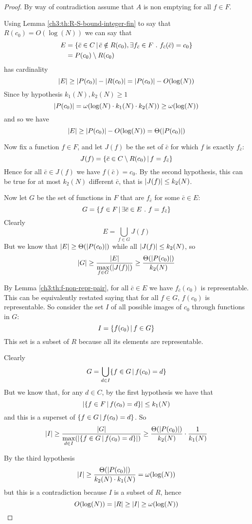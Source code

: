 \begin{proof}
	By way of contradiction assume that $A$ is non emptying for all $f \in F$.

	Using Lemma \ref{ch3:th:R-S-bound-integer-fin} to say that $R(c_0) = O(\log(N))$ we can say that
	\begin{align*}
		E &= \{ \bar{c} \in C \,\vert\, \bar{c} \notin R(c_0), \exists f_{\bar{c}} \in F\ .\ f_{\bar{c}}(\bar{c}) = c_0 \} \\
		&= P(c_0) \setminus R(c_0)
	\end{align*}
	has cardinality
	\[
	\lvert E\rvert \ge \lvert P(c_0)\rvert - \lvert R(c_0)\rvert = \lvert P(c_0)\rvert - O(\log(N))
	\]
	Since by hypothesis $k_1(N), k_2(N) \ge 1$
	\[
	\lvert P(c_0)\rvert = \omega(\log(N) \cdot k_1(N) \cdot k_2(N)) \ge \omega(\log(N))
	\]
	and so we have
	\[
	\lvert E\rvert \ge \lvert P(c_0)\rvert - O(\log(N)) = \Theta(\lvert P(c_0)\rvert)
	\]

	Now fix a function $f \in F$, and let $J(f)$ be the set of $\bar{c}$ for which $f$ is exactly $f_{\bar{c}}$:
	\[
	J(f) = \{ \bar{c} \in C \setminus R(c_0) \,\vert\, f = f_{\bar{c}} \}
	\]
	Hence for all $\bar{c} \in J(f)$ we have $f(\bar{c}) = c_0$. By the second hypothesis, this can be true for at most $k_2(N)$ different $\bar{c}$, that is $\lvert J(f)\rvert \le k_2(N)$.

	Now let $G$ be the set of functions in $F$ that are $f_{\bar{c}}$ for some $\bar{c} \in E$:
	\[
	G = \{ f \in F \,\vert\, \exists \bar{c} \in E\ .\ f = f_{\bar{c}} \}
	\]
	Clearly
	\[
	E = \bigcup\limits_{f \in G} J(f)
	\]
	But we know that $\lvert E\rvert \ge \Theta(\lvert P(c_0)\rvert)$ while all $\lvert J(f)\rvert \le k_2(N)$, so
	\[
	\lvert G\rvert \ge \frac{\lvert E\rvert}{\max\limits_{f \in G}(\lvert J(f)\rvert)} \ge \frac{\Theta(\lvert P(c_0)\rvert)}{k_2(N)}
	\]

	By Lemma \ref{ch3:th:f-non-repr-pair}, for all $\bar{c} \in E$ we have $f_{\bar{c}}(c_0)$ is representable. This can be equivalently restated saying that for all $f \in G$, $f(c_0)$ is representable.
	So consider the set $I$ of all possible images of $c_0$ through functions in $G$:
	\[
	I = \{ f(c_0) \,\vert\, f \in G \}
	\]
	This set is a subset of $R$ because all its elements are representable.

	Clearly
	\[
	G = \bigcup\limits_{d \in I} \{ f \in G \,\vert\, f(c_0) = d \}
	\]
	But we know that, for any $d \in C$, by the first hypothesis we have that
	\[
	\lvert\{ f \in F \,\vert\, f(c_0) = d \}\rvert \le k_1(N)
	\]
	and this is a superset of $\{ f \in G \,\vert\, f(c_0) = d \}$. So
	\[
	\lvert I\rvert \ge \frac{\lvert G\rvert}{\max\limits_{d \in I} (\lvert\{ f \in G \,\vert\, f(c_0) = d \}\rvert)} \ge \frac{\Theta(\lvert P(c_0)\rvert)}{k_2(N)} \cdot \frac{1}{k_1(N)}
	\]

	By the third hypothesis
	\[
	\lvert I\rvert \ge \frac{\Theta(\lvert P(c_0)\rvert)}{k_2(N) \cdot  k_1(N)} = \omega(\log(N))
	\]
	but this is a contradiction because $I$ is a subset of $R$, hence
	\[
	O(\log(N)) = \lvert R\rvert \ge \lvert I\rvert \ge \omega(\log(N))
	\]
\end{proof}
